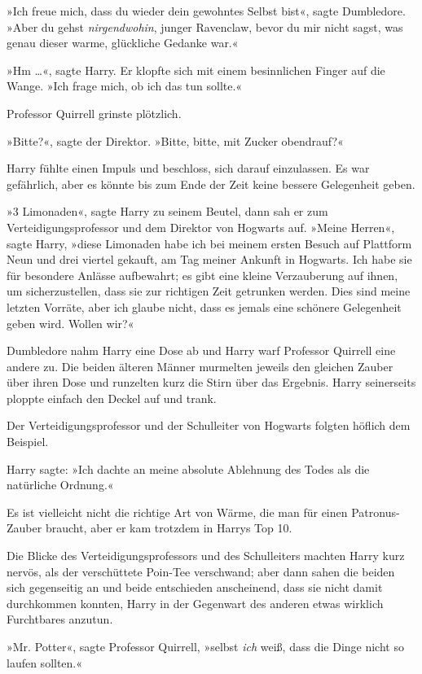 {»Ich freue mich, dass du wieder dein gewohntes Selbst bist«, sagte Dumbledore. »Aber du gehst \emph{nirgendwohin}, junger Ravenclaw, bevor du mir nicht sagst, was genau dieser warme, glückliche Gedanke war.«

»Hm …«, sagte Harry. Er klopfte sich mit einem besinnlichen Finger auf die Wange. »Ich frage mich, ob ich das tun sollte.«

Professor Quirrell grinste plötzlich.

»Bitte?«, sagte der Direktor. »Bitte, bitte, mit Zucker obendrauf?«

Harry fühlte einen Impuls und beschloss, sich darauf einzulassen. Es war gefährlich, aber es könnte bis zum Ende der Zeit keine bessere Gelegenheit geben.

»3 Limonaden«, sagte Harry zu seinem Beutel, dann sah er zum Verteidigungsprofessor und dem Direktor von Hogwarts auf. »Meine Herren«, sagte Harry, »diese Limonaden habe ich bei meinem ersten Besuch auf Plattform Neun und drei viertel gekauft, am Tag meiner Ankunft in Hogwarts. Ich habe sie für besondere Anlässe aufbewahrt; es gibt eine kleine Verzauberung auf ihnen, um sicherzustellen, dass sie zur richtigen Zeit getrunken werden. Dies sind meine letzten Vorräte, aber ich glaube nicht, dass es jemals eine schönere Gelegenheit geben wird. Wollen wir?«

Dumbledore nahm Harry eine Dose ab und Harry warf Professor Quirrell eine andere zu. Die beiden älteren Männer murmelten jeweils den gleichen Zauber über ihren Dose und runzelten kurz die Stirn über das Ergebnis. Harry seinerseits ploppte einfach den Deckel auf und trank.

Der Verteidigungsprofessor und der Schulleiter von Hogwarts folgten höflich dem Beispiel.

Harry sagte: »Ich dachte an meine absolute Ablehnung des Todes als die natürliche Ordnung.«

Es ist vielleicht nicht die richtige Art von Wärme, die man für einen Patronus-Zauber braucht, aber er kam trotzdem in Harrys Top 10.

Die Blicke des Verteidigungsprofessors und des Schulleiters machten Harry kurz nervös, als der verschüttete Poin-Tee verschwand; aber dann sahen die beiden sich gegenseitig an und beide entschieden anscheinend, dass sie nicht damit durchkommen konnten, Harry in der Gegenwart des anderen etwas wirklich Furchtbares anzutun.

»Mr. Potter«, sagte Professor Quirrell, »selbst \emph{ich} weiß, dass die Dinge nicht so laufen sollten.«

}
